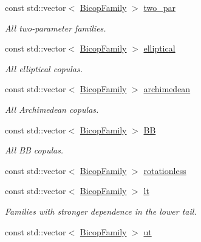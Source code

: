 \begin{DoxyCompactItemize}
const std\+::vector$<$ \hyperlink{namespacevinecopulib_a42e95cc06d33896199caab0c11ad44f3}{Bicop\+Family} $>$ \hyperlink{namespacevinecopulib_1_1bicop__families_ad5871c39b4ee62bd44fa851d7d70c7ca}{two\+\_\+par}
\begin{DoxyCompactList}\small\item\em All two-\/parameter families. \end{DoxyCompactList}\item 
const std\+::vector$<$ \hyperlink{namespacevinecopulib_a42e95cc06d33896199caab0c11ad44f3}{Bicop\+Family} $>$ \hyperlink{namespacevinecopulib_1_1bicop__families_a24b790671c9f4b25e57ecbc3505232fb}{elliptical}
\begin{DoxyCompactList}\small\item\em All elliptical copulas. \end{DoxyCompactList}\item 
const std\+::vector$<$ \hyperlink{namespacevinecopulib_a42e95cc06d33896199caab0c11ad44f3}{Bicop\+Family} $>$ \hyperlink{namespacevinecopulib_1_1bicop__families_a714863b69ae59ac48c7fb2be45cd2619}{archimedean}
\begin{DoxyCompactList}\small\item\em All Archimedean copulas. \end{DoxyCompactList}\item 
const std\+::vector$<$ \hyperlink{namespacevinecopulib_a42e95cc06d33896199caab0c11ad44f3}{Bicop\+Family} $>$ \hyperlink{namespacevinecopulib_1_1bicop__families_aea9f7383b4bbbe47d4862f25e6bb8ad8}{B\+B}
\begin{DoxyCompactList}\small\item\em All B\+B copulas. \end{DoxyCompactList}\item 
const std\+::vector$<$ \hyperlink{namespacevinecopulib_a42e95cc06d33896199caab0c11ad44f3}{Bicop\+Family} $>$ \hyperlink{namespacevinecopulib_1_1bicop__families_ac221bc84c32d2836692ed40d89439928}{rotationless}
\item 
const std\+::vector$<$ \hyperlink{namespacevinecopulib_a42e95cc06d33896199caab0c11ad44f3}{Bicop\+Family} $>$ \hyperlink{namespacevinecopulib_1_1bicop__families_a5a5f349f07638768ff8b1bb2ae90d102}{lt}
\begin{DoxyCompactList}\small\item\em Families with stronger dependence in the lower tail. \end{DoxyCompactList}\item 
const std\+::vector$<$ \hyperlink{namespacevinecopulib_a42e95cc06d33896199caab0c11ad44f3}{Bicop\+Family} $>$ \hyperlink{namespacevinecopulib_1_1bicop__families_af754a2d2697709c204dda0473215f9cd}{ut}

\end{DoxyCompactItemize}

